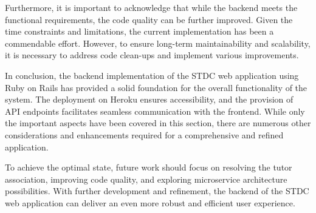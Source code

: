 \begin{justify}
        \vspace{0.25cm}
        \newendline Furthermore, it is important to acknowledge that while the backend meets the functional requirements, the code quality can be further improved. Given the time constraints and limitations, the current implementation has been a commendable effort. However, to ensure long-term maintainability and scalability, it is necessary to address code clean-ups and implement various improvements.
        
        \vspace{0.25cm}
        \newendline In conclusion, the backend implementation of the STDC web application using Ruby on Rails has provided a solid foundation for the overall functionality of the system. The deployment on Heroku ensures accessibility, and the provision of API endpoints facilitates seamless communication with the frontend. While only the important aspects have been covered in this section, there are numerous other considerations and enhancements required for a comprehensive and refined application.
        
        \vspace{0.25cm}
        \newendline To achieve the optimal state, future work should focus on resolving the tutor association, improving code quality, and exploring microservice architecture possibilities. With further development and refinement, the backend of the STDC web application can deliver an even more robust and efficient user experience.
    \clearpage

    
\end{justify}
\clearpage




